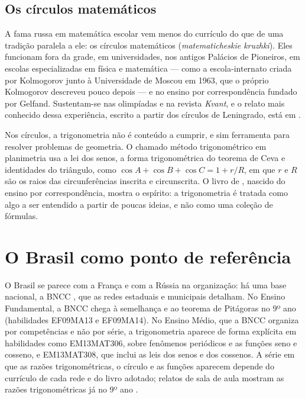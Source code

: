 \documentclass[
    article,
    12pt,
    a4paper,
    sumario=tradicional
]{abntex2}
\begin{document}
\subsection{Os círculos matemáticos}

A fama russa em matemática escolar vem menos do currículo do que de uma
tradição paralela a ele: os círculos matemáticos (\textit{matematicheskie
kruzhki}). Eles funcionam fora da grade, em universidades, nos antigos
Palácios de Pioneiros, em escolas especializadas em física e matemática ---
como a escola-internato criada por Kolmogorov junto à Universidade de Moscou
em 1963, que o próprio Kolmogorov descreveu pouco depois
\cite{kolmogorov1964} --- e no ensino por correspondência fundado por Gelfand. Sustentam-se
nas olimpíadas e na revista \textit{Kvant}, e o relato mais conhecido dessa
experiência, escrito a partir dos círculos de Leningrado, está em
.

Nos círculos, a trigonometria não é conteúdo a cumprir, e sim ferramenta para
resolver problemas de geometria. O chamado método trigonométrico em
planimetria usa a lei dos senos, a forma trigonométrica do teorema de Ceva e
identidades do triângulo, como $\cos A + \cos B + \cos C = 1 + r/R$, em que $r$ e
$R$ são os raios das circunferências inscrita e circunscrita. O livro de
, nascido do ensino por correspondência, mostra o
espírito: a trigonometria é tratada como algo a ser entendido a partir de
poucas ideias, e não como uma coleção de fórmulas.

\section{O Brasil como ponto de referência}

O Brasil se parece com a França e com a Rússia na organização: há uma base
nacional, a BNCC \cite{bncc2018}, que as redes estaduais e municipais
detalham. No Ensino Fundamental, a BNCC chega à semelhança e ao teorema de
Pitágoras no 9º ano (habilidades EF09MA13 e EF09MA14). No Ensino Médio, que a
BNCC organiza por competências e não por série, a trigonometria aparece de
forma explícita em habilidades como EM13MAT306, sobre fenômenos periódicos e
as funções seno e cosseno, e EM13MAT308, que inclui as leis dos senos e dos
cossenos. %
A série em que as razões trigonométricas, o círculo e as funções aparecem
depende do currículo de cada rede e do livro adotado; relatos de sala de aula
mostram as razões trigonométricas já no 9º ano \cite{jurgensen2019}.
\end{document}
